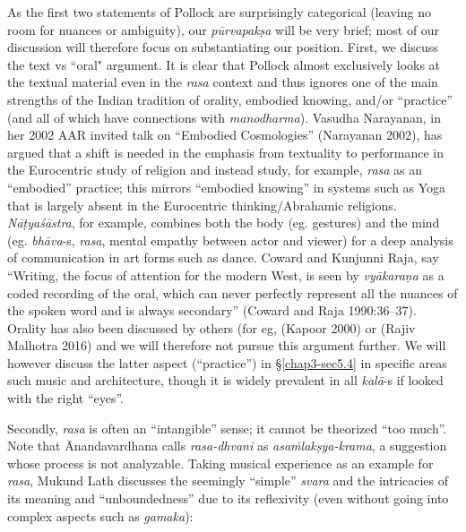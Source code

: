 As the first two statements of Pollock are surprisingly categorical (leaving no room for nuances or ambiguity), our \textsl{pūrvapakṣa} will be very brief; most of our discussion will therefore focus on substantiating our position. First, we discuss the text vs “oral" argument. It is clear that Pollock almost exclusively looks at the textual material even in the \textsl{rasa} context and thus ignores one of the main strengths of the Indian tradition of orality, embodied knowing, and/or “practice” (and all of which have connections with \textsl{manodharma}). Vasudha Narayanan, in her 2002 AAR invited talk on “Embodied Cosmologies” (Narayanan 2002), has argued that a shift is needed in the emphasis from textuality to performance in the Eurocentric study of religion and instead study, for example, \textsl{rasa} as an “embodied” practice; this mirrors “embodied knowing” in systems such as Yoga that is largely absent in the Eurocentric thinking/Abrahamic religions. \textsl{Nāṭyaśāstra}, for example, combines both the body (eg. gestures) and the mind (eg. \textsl{bhāva}-s, \textsl{rasa}, mental empathy between actor and viewer) for a deep analysis of communication in art forms such as dance. Coward and Kunjunni Raja, say “Writing, the focus of attention for the modern West, is seen by \textsl{vyākaraṇa} as a coded recording of the oral, which can never perfectly represent all the nuances of the spoken word and is always secondary” (Coward and Raja 1990:36--37). Orality has also been discussed by others (for eg, (Kapoor 2000) or (Rajiv Malhotra 2016) and we will therefore not pursue this argument further. We will however discuss the latter aspect (“practice”) in \S\ref{chap3-sec5.4} in specific areas such music and architecture, though it is widely prevalent in all \textsl{kalā}-s if looked with the right “eyes”.

\newpage

Secondly, \textsl{rasa} is often an “intangible” sense; it cannot be theorized “too much”. Note that Ānandavardhana calls \textsl{rasa-dhvani} as \textsl{asaṁlakṣya-krama}, a suggestion whose process is not analyzable. Taking musical experience as an example for \textsl{rasa}, Mukund Lath discusses the seemingly “simple” \textsl{svara} and the intricacies of its meaning and “unboundedness” due to its reflexivity (even without going into complex aspects such as \textsl{gamaka}):

